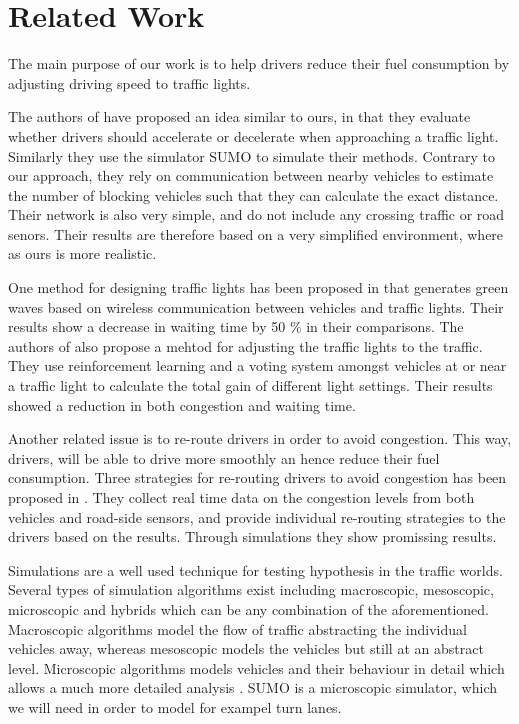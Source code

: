 \section{Related Work}

The main purpose of our work is to help drivers reduce their fuel consumption by adjusting driving speed to traffic lights.

The authors of \cite{VANETsim} have proposed an idea similar to ours, in that they evaluate whether drivers should accelerate or decelerate when approaching a traffic light.
Similarly they use the simulator SUMO to simulate their methods. 
Contrary to our approach, they rely on communication between nearby vehicles to estimate the number of blocking vehicles such that they can calculate the exact distance.
Their network is also very simple, and do not include any crossing traffic or road senors. 
Their results are therefore based on a very simplified environment, where as ours is more realistic.

One method for designing traffic lights has been proposed in \cite{SOTL} that generates green waves based on wireless communication between vehicles and traffic lights. Their results show a decrease in waiting time by 50 \% in their comparisons.
The authors of \cite{ITLC} also propose a mehtod for adjusting the traffic lights to the traffic. They use reinforcement learning and a voting system amongst vehicles at or near a traffic light to calculate the total gain of different light settings. Their results showed a reduction in both congestion and waiting time.

Another related issue is to re-route drivers in order to avoid congestion. This way, drivers, will be able to drive more smoothly an hence reduce their fuel consumption. 
Three strategies for re-routing drivers to avoid congestion has been proposed in \cite{congestionAvoidance}. 
They collect real time data on the congestion levels from both vehicles and road-side sensors, and provide individual re-routing strategies to the drivers based on the results. Through simulations they show promissing results.

Simulations are a well used technique for testing hypothesis in the traffic worlds.
Several types of simulation algorithms exist including macroscopic, mesoscopic, microscopic and hybrids which can be any combination of the aforementioned. 
Macroscopic algorithms model the flow of traffic abstracting the individual vehicles away, whereas mesoscopic models the vehicles but still at an abstract level. 
Microscopic algorithms models vehicles and their behaviour in detail which allows a much more detailed analysis \cite{meso-micro}. 
SUMO is a microscopic simulator, which we will need in order to model for exampel turn lanes.

